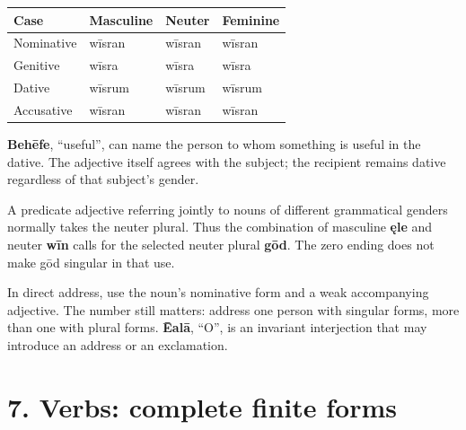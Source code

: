 \par\begingroup
\fontsize{10.5}{13.2}\selectfont
\setlength{\LTleft}{0pt}\setlength{\LTright}{\fill}
\noindent
\begin{tabular}{@{}>{\raggedright\arraybackslash}p{28.89mm}>{\raggedright\arraybackslash}p{28.89mm}>{\raggedright\arraybackslash}p{28.89mm}>{\raggedright\arraybackslash}p{28.89mm}@{}}
\toprule
\textbf{Case} & \textbf{Masculine} & \textbf{Neuter} & \textbf{Feminine} \\
\midrule
Nominative & wīsran & wīsran & wīsran \\
Genitive & wīsra & wīsra & wīsra \\
Dative & wīsrum & wīsrum & wīsrum \\
Accusative & wīsran & wīsran & wīsran \\
\bottomrule
\end{tabular}
\par\endgroup

\textbf{Behēfe}, “useful”, can name the person to whom something is useful in the dative. The adjective itself agrees with the subject; the recipient remains dative regardless of that subject’s gender.

A predicate adjective referring jointly to nouns of different grammatical genders normally takes the neuter plural. Thus the combination of masculine \textbf{ęle} and neuter \textbf{wīn} calls for the selected neuter plural \textbf{gōd}. The zero ending does not make gōd singular in that use.

In direct address, use the noun’s nominative form and a weak accompanying adjective. The number still matters: address one person with singular forms, more than one with plural forms. \textbf{Ēalā}, “O”, is an invariant interjection that may introduce an address or an exclamation.

\section*{7. Verbs: complete finite forms}

